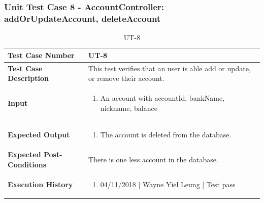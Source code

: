 \documentclass[12pt]{article}
\begin{document}
\subsubsection{Unit Test Case 8 - AccountController: addOrUpdateAccount, deleteAccount}
\def\arraystretch{1.5}%
\begin{table}[htbp]
\centering
\caption{UT-8}
\label{UT-8}
\begin{tabularx}{\textwidth}{ | l | X |}
\hline
\textbf{Test Case Number}      		&  UT-8                   			\\ \hline
\textbf{Test Case Description}    	&  This test verifies that an user is able add or update, or remove their account.                 				\\ \hline
\textbf{Input}         			& 
\begin{enumerate}
\item An account with accountId, bankName, nickname, balance
\end{enumerate} 		\\ \hline
\textbf{Expected Output}     		&
\begin{enumerate}
\item The account is deleted from the database.
\end{enumerate} 		\\ \hline
\textbf{Expected Post-Conditions}	&   There is one less account in the database.                 				\\ \hline
\textbf{Execution History}   		&  	\begin{enumerate}
								\item 04/11/2018 | Wayne Yiel Leung | Test pass
							\end {enumerate} \\ \hline
\end{tabularx}
\end{table}
\clearpage


\end{document}
